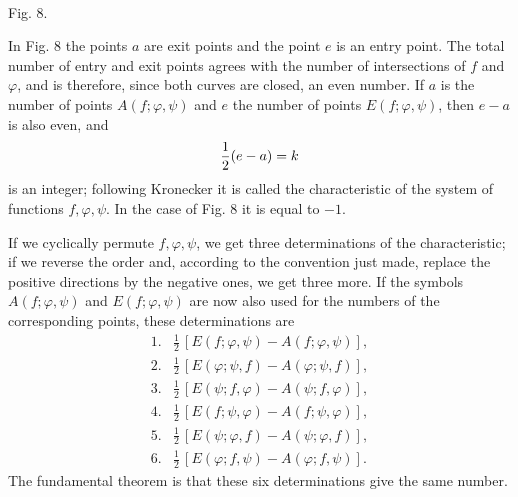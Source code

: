 \documentclass[11pt]{article}
\begin{document}
\begin{center}
\\[-0.2em]
{\small Fig. 8.}
\end{center}


In Fig. 8 the points $a$ are exit points and the point $e$ is an entry point. The total number of entry and exit points agrees with the number of intersections of $f$ and $\varphi$, and is therefore, since both curves are closed, an even number. If $a$ is the number of points $A(f;\varphi,\psi)$ and $e$ the number of points $E(f;\varphi,\psi)$, then $e-a$ is also even, and
\[
        {1\over2}(e-a)=k
\]
is an integer; following Kronecker it is called the characteristic of the system of functions $f,\varphi,\psi$. In the case of Fig. 8 it is equal to $-1$.

If we cyclically permute $f,\varphi,\psi$, we get three determinations of the characteristic; if we reverse the order and, according to the convention just made, replace the positive directions by the negative ones, we get three more. If the symbols $A(f;\varphi,\psi)$ and $E(f;\varphi,\psi)$ are now also used for the numbers of the corresponding points, these determinations are
\[
\begin{array}{ll}
1.&\frac12\,[E(f;\varphi,\psi)-A(f;\varphi,\psi)],\\
2.&\frac12\,[E(\varphi;\psi,f)-A(\varphi;\psi,f)],\\
3.&\frac12\,[E(\psi;f,\varphi)-A(\psi;f,\varphi)],\\
4.&\frac12\,[E(f;\psi,\varphi)-A(f;\psi,\varphi)],\\
5.&\frac12\,[E(\psi;\varphi,f)-A(\psi;\varphi,f)],\\
6.&\frac12\,[E(\varphi;f,\psi)-A(\varphi;f,\psi)].
\end{array}
\]
The fundamental theorem is that these six determinations give the same number.
\end{document}
